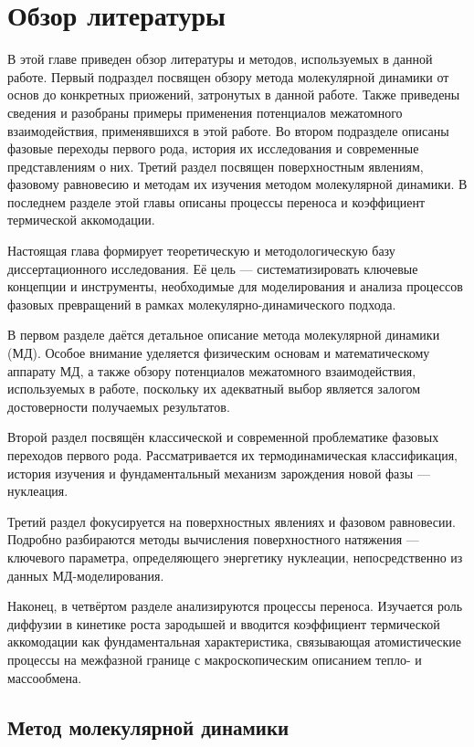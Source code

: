 \chapter{Обзор литературы}\label{ch:ch1}

В этой главе приведен обзор литературы и методов, используемых в данной работе. Первый подраздел посвящен обзору метода молекулярной динамики от основ до конкретных приожений, затронутых  в данной работе. Также приведены сведения и разобраны примеры применения потенциалов межатомного взаимодействия, применявшихся в этой работе. Во втором подразделе описаны фазовые переходы первого рода, история их исследования и современные представлениям о них. Третий раздел посвящен поверхностным явлениям, фазовому равновесию и методам их изучения методом молекулярной динамики. В последнем разделе этой главы описаны процессы переноса и коэффициент термической аккомодации.

Настоящая глава формирует теоретическую и методологическую базу диссертационного исследования. Её цель — систематизировать ключевые концепции и инструменты, необходимые для моделирования и анализа процессов фазовых превращений в рамках молекулярно-динамического подхода. 

В первом разделе даётся детальное описание метода молекулярной динамики (МД). Особое внимание уделяется физическим основам и математическому аппарату МД, а также обзору потенциалов межатомного взаимодействия, используемых в работе, поскольку их адекватный выбор является залогом достоверности получаемых результатов.

Второй раздел посвящён классической и современной проблематике фазовых переходов первого рода. Рассматривается их термодинамическая классификация, история изучения и фундаментальный механизм зарождения новой фазы — нуклеация.

Третий раздел фокусируется на поверхностных явлениях и фазовом равновесии. Подробно разбираются методы вычисления поверхностного натяжения — ключевого параметра, определяющего энергетику нуклеации, непосредственно из данных МД-моделирования.

Наконец, в четвёртом разделе анализируются процессы переноса. Изучается роль диффузии в кинетике роста зародышей и вводится коэффициент термической аккомодации как фундаментальная характеристика, связывающая атомистические процессы на межфазной границе с макроскопическим описанием тепло- и массообмена. 

\section{Метод молекулярной динамики}

